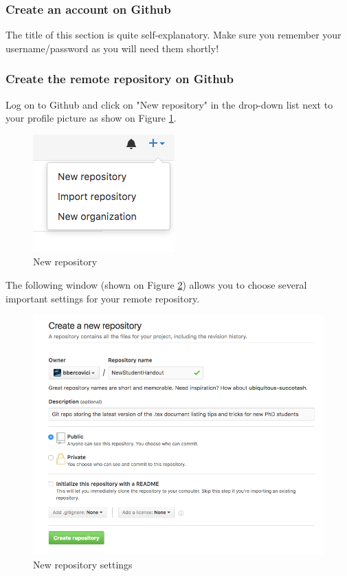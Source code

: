\documentclass{report}
\begin{document}
\subsubsection{Create an account on Github}
The title of this section is quite self-explanatory. Make sure you remember your username/password as you will need them shortly!
\subsubsection{Create the remote repository on Github}
Log on to Github and click on "New repository" in the drop-down list next to your profile picture as show on Figure \ref{fig:new_repo}.
\begin{figure}[H]
\centering
\includegraphics[scale=0.5]{new_repo}
\caption{New repository}
\label{fig:new_repo}
\end{figure}

The following window (shown on Figure \ref{fig:new_repo_settings}) allows you to choose several important settings for your remote repository.
\begin{figure}[H]
\centering
\includegraphics[scale=0.6]{new_repo_settings}
\caption{New repository settings}
\label{fig:new_repo_settings}
\end{figure}
\end{document}
